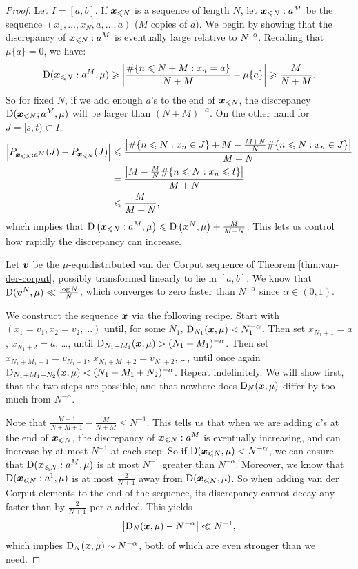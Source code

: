 \begin{proof}
Let $I = [a,b]$. If ${\boldsymbol x}_{\leqslant N}$ is a sequence of length $N$, let 
${\boldsymbol x}_{\leqslant N}: a^M$ be the sequence $(x_1,\dots,x_N,a,\dots,a)$ ($M$ copies 
of $a$). We begin by showing that the discrepancy of ${\boldsymbol x}_{\leqslant N}:a^M$ 
is eventually large relative to $N^{-\alpha}$. Recalling that $\mu\{a\} = 0$, 
we have:
\[
	\operatorname{D}({\boldsymbol x}_{\leqslant N}: a^M,\mu)
		\geqslant \left| \frac{\#\{ n\leqslant N+M : x_n = a\}}{N+M} - \mu\{a\}\right| 
		\geqslant \frac{M}{N+M} .
\]
So for fixed $N$, if we add enough $a$'s to the end of ${\boldsymbol x}_{\leqslant N}$, the 
discrepancy $\operatorname{D}({\boldsymbol x}_{\leqslant N};a^M,\mu)$ will be larger than 
$(N+M)^{-\alpha}$. On the other hand for $J = [s,t)\subset I$, 
\begin{align*}
	\left| P_{{\boldsymbol x}_{\leqslant N}: a^M}(J) - P_{{\boldsymbol x}_{\leqslant N}}(J)\right| 
		&\leqslant \frac{\left|\#\{n\leqslant N : x_n\in J\} + M - \frac{M+N}{N}\#\{n\leqslant N : x_n\in J\}\right|}{M+N} \\
		&= \frac{\left|M - \frac{M}{N} \#\{n\leqslant N : x_n \leqslant t\} \right|}{M+N} \\
		&\leqslant \frac{M}{M+N} ,
\end{align*}
which implies that 
$\operatorname{D}\left({\boldsymbol x}_{\leqslant N}: a^M,\mu\right) \leqslant \operatorname{D}\left({\boldsymbol x}^N,\mu\right) + \frac{M}{M+N}$. This lets us control how rapidly the discrepancy can increase. 

Let ${\boldsymbol v}$ be the $\mu$-equidistributed van der Corput sequence of 
Theorem \ref{thm:van-der-corput}, possibly transformed linearly to lie in 
$[a,b]$. We know that $\operatorname{D}({\boldsymbol v}^N, \mu) \ll \frac{\log N}{N}$, which converges 
to zero faster than $N^{-\alpha}$ since $\alpha\in \left(0, 1\right)$. 

We construct the sequence ${\boldsymbol x}$ via the following recipe. Start with 
$(x_1 = v_1,x_2 = v_2,\dots)$ until, for some $N_1$, 
$\operatorname{D}_{N_1}({\boldsymbol x},\mu) < N_1^{-\alpha}$. Then set $x_{N_1+1} = a$, 
$x_{N_1+2} = a$, \dots, until 
$\operatorname{D}_{N_1+M_1}({\boldsymbol x},\mu) > (N_1+M_1)^{-\alpha}$. Then set 
$x_{N_1+M_1+1} = v_{N_1+1}$, $x_{N_1+M_1+2} = v_{N_1+2}$, \dots, 
until once again 
$\operatorname{D}_{N_1+M_1+N_2}({\boldsymbol x},\mu) < (N_1+M_1+N_2)^{-\alpha}$. Repeat 
indefinitely. We will show first, that the two steps are possible, and that 
nowhere does $\operatorname{D}_N({\boldsymbol x},\mu)$ differ by too much from $N^{-\alpha}$. 

Note that $\frac{M+1}{N+M+1} - \frac{M}{N+M} \leqslant N^{-1}$. This tells 
us that when we are adding $a$'s at the end of ${\boldsymbol x}_{\leqslant N}$, the 
discrepancy of 
${\boldsymbol x}_{\leqslant N}: a^M$ is eventually increasing, and can increase by at most 
$N^{-1}$ at each 
step. So if $\operatorname{D}({\boldsymbol x}_{\leqslant N},\mu) < N^{-\alpha}$, we can ensure that 
$\operatorname{D}({\boldsymbol x}_{\leqslant N}: a^M,\mu)$ is at most $N^{-1}$ greater than 
$N^{-\alpha}$. 
Moreover, we know that $\operatorname{D}({\boldsymbol x}_{\leqslant N}: a^1,\mu)$ is at most 
$\frac{2}{N+1}$ away from $\operatorname{D}({\boldsymbol x}_{\leqslant N},\mu)$. So when adding van der 
Corput elements to the end of the sequence, its discrepancy cannot decay any 
faster than by $\frac{2}{N+1}$ per $a$ added. This yields 
\[
	\left|\operatorname{D}_N({\boldsymbol x},\mu) - N^{-\alpha}\right| \ll N^{-1} , 
\]
which implies $\operatorname{D}_N({\boldsymbol x},\mu) \sim N^{-\alpha}$, both of which are even 
stronger than we need.
\end{proof}
